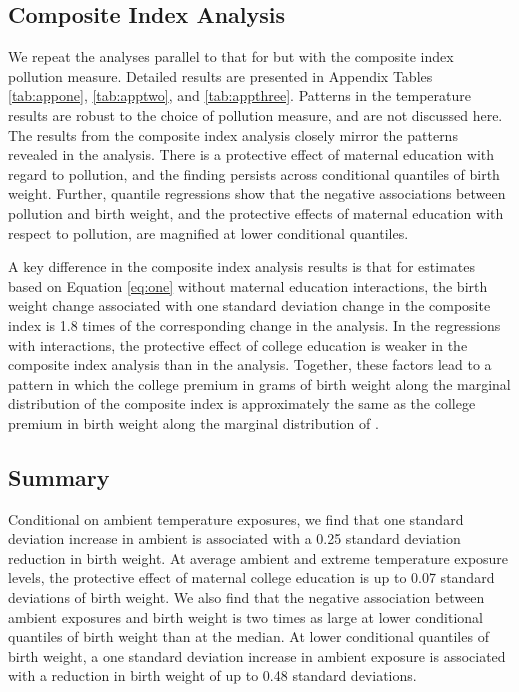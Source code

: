 \subsection{Composite Index Analysis\label{composite-index-analysis}}

We repeat the analyses parallel to that for \PARPMTEN but with the composite index pollution
measure. Detailed results are presented in Appendix Tables \ref{tab:appone}, \ref{tab:apptwo}, and \ref{tab:appthree}. Patterns
in the temperature results are robust to the choice of pollution measure,
and are not discussed here. The results from the composite index
analysis closely mirror the patterns revealed in the \PARPMTEN analysis.
There is a protective effect of maternal education with regard to
pollution, and the finding persists across conditional quantiles of
birth weight. Further, quantile
regressions show that the negative associations between pollution
and birth weight, and the protective effects of maternal education with
respect to pollution, are magnified at lower conditional quantiles.

A key difference in the composite index analysis results is that for estimates based on Equation \eqref{eq:one} without maternal education
interactions, the birth weight change associated with one standard
deviation change in the composite index is 1.8 times of the corresponding
change in the \PARPMTEN analysis. In the regressions with interactions, the
protective effect of college education is weaker in the
composite index analysis than in the \PARPMTEN analysis. Together, these
factors lead to a pattern in which the college premium in grams of birth
weight along the marginal distribution of the composite index is
approximately the same as the college premium in birth weight along the
marginal distribution of \PARPMTEN.


\subsection{Summary}
Conditional on ambient temperature exposures, we find that one standard deviation increase in ambient \PARPMTEN is associated with a 0.25 standard deviation reduction in birth weight. At average ambient \PARPMTEN and extreme temperature exposure levels, the protective effect of maternal college education is up to 0.07 standard deviations of birth weight. We also find that the negative association between ambient exposures and birth weight is two times as large at lower conditional quantiles of birth weight than at the median. At lower conditional quantiles of birth weight, a one standard deviation
increase in ambient \PARPMTEN exposure is associated with a reduction in birth weight of up to 0.48 standard
deviations. 

